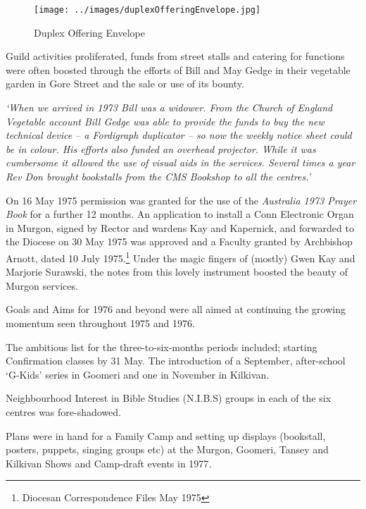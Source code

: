 \begin{figure}
\begin{center}
\texttt{[image: ../images/duplexOfferingEnvelope.jpg]}
\caption{Duplex Offering Envelope}
\end{center}
\end{figure}




Guild activities proliferated, funds from street stalls and catering for functions were often boosted through the efforts of Bill and May Gedge in their vegetable garden in Gore Street and the sale or use of its bounty.



\emph{`When we arrived in 1973 Bill was a widower. From the Church of England Vegetable account Bill Gedge was able to provide the funds to buy the new technical device -- a Fordigraph duplicator -- so now the weekly notice sheet could be in colour. His efforts also funded an overhead projector. While it was cumbersome it allowed the use of visual aids in the services. Several times a year Rev Don brought bookstalls from the CMS Bookshop to all the centres.'}



On 16 May 1975 permission was granted for the use of the \emph{Australia 1973 Prayer Book} for a further 12 months. An application to install a Conn Electronic Organ in Murgon, signed by Rector and wardens Kay and Kapernick, and forwarded to the Diocese on 30 May 1975 was approved and a Faculty granted by Archbishop Arnott, dated 10 July 1975.\footnote{Diocesan Correspondence Files May 1975} Under the magic fingers of (mostly) Gwen Kay and Marjorie Surawski, the notes from this lovely instrument boosted the beauty of Murgon services.


Goals and Aims for 1976 and beyond were all aimed at continuing the growing momentum seen throughout 1975 and 1976.



The ambitious list for the three-to-six-months periods included; starting Confirmation classes by 31 May. The introduction of a September, after-school `G-Kids' series in Goomeri and one in November in Kilkivan.



Neighbourhood Interest in Bible Studies (N.I.B.S) groups in each of the six centres was fore-shadowed.



Plans were in hand for a Family Camp and setting up displays (bookstall, posters, puppets, singing groups etc) at the Murgon, Goomeri, Tansey and Kilkivan Shows and Camp-draft events in 1977\emph{.}



